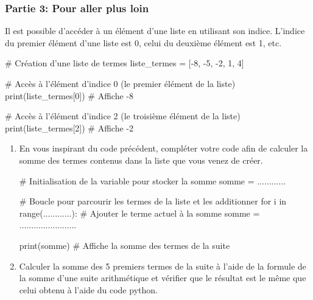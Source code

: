 \documentclass[11pt, a4paper]{report}
\begin{document}
\subsubsection{Partie 3: Pour aller plus loin}

\begin{easybox}
    Il est possible d'accéder à un élément d'une liste en utilisant son indice. L'indice du premier élément d'une liste est 0, celui du deuxième élément est 1, etc.    
    \begin{CodePythontexAlt}[TaillePolice = \large, Largeur=17cm,Centre,PremLigne=1]{}
# Création d'une liste de termes
liste_termes = [-8, -5, -2, 1, 4]

# Accès à l'élément d'indice 0 (le premier élément de la liste)
print(liste_termes[0])  # Affiche -8

# Accès à l'élément d'indice 2 (le troisième élément de la liste)
print(liste_termes[2])  # Affiche -2
    \end{CodePythontexAlt}
    
\end{easybox}
\begin{enumerate}
    \item En vous inspirant du code précédent, compléter votre code afin de calculer la somme des termes contenus dans la liste que vous venez de créer.

\begin{CodePythontexAlt}[TaillePolice = \large, Largeur=17cm,Centre,PremLigne=1]{}
# Initialisation de la variable pour stocker la somme
somme = ............

# Boucle pour parcourir les termes de la liste et les additionner
for i in range(............):
    # Ajouter le terme actuel à la somme
    somme = ........................

print(somme)  # Affiche la somme des termes de la suite
\end{CodePythontexAlt}
    
\medskip

\item Calculer la somme des 5 premiers termes de la suite à l'aide de la formule de la somme d'une suite arithmétique et vérifier que le résultat est le même que celui obtenu à l'aide du code python.
\end{enumerate}
\end{document}
